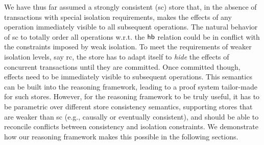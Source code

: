 We have thus far assumed a strongly consistent ({\sc sc}) store that,
in the absence of transactions with special isolation requirements,
makes the effects of any operation immediately visible to all
subsequent operations. The natural behavior of {\sc sc} to totally
order all operations w.r.t. the $\textsf{hb}$ relation could be in conflict
with the constraints imposed by weak isolation. To meet the
requirements of weaker isolation levels, say {\sc rc}, the store has
to adapt itself to \emph{hide} the effects of concurrent transactions
until they are committed. Once committed though, effects need to be
immediately visible to subsequent operations. This semantics can be
built into the reasoning framework, leading to a proof system
tailor-made for such stores. However, for the reasoning framework to
be truly useful, it has to be parametric over different store
consistency semantics, supporting stores that are weaker than {\sc sc}
(e.g., causally or eventually consistent), and should be able to
reconcile conflicts between consistency and isolation constraints.  We
demonstrate how our reasoning framework makes this possible in the
following sections.
